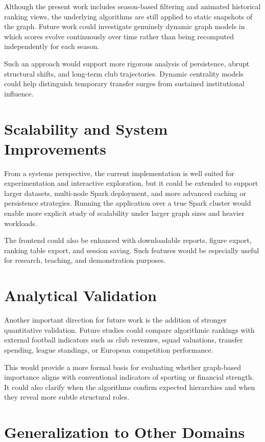 Although the present work includes season-based filtering and animated historical ranking views, the underlying algorithms are still applied to static snapshots of the graph. Future work could investigate genuinely dynamic graph models in which scores evolve continuously over time rather than being recomputed independently for each season.

Such an approach would support more rigorous analysis of persistence, abrupt structural shifts, and long-term club trajectories. Dynamic centrality models could help distinguish temporary transfer surges from sustained institutional influence.

\section{Scalability and System Improvements}
\label{sec:future_system}

From a systems perspective, the current implementation is well suited for experimentation and interactive exploration, but it could be extended to support larger datasets, multi-node Spark deployment, and more advanced caching or persistence strategies. Running the application over a true Spark cluster would enable more explicit study of scalability under larger graph sizes and heavier workloads.

The frontend could also be enhanced with downloadable reports, figure export, ranking table export, and session saving. Such features would be especially useful for research, teaching, and demonstration purposes.

\section{Analytical Validation}
\label{sec:future_validation}

Another important direction for future work is the addition of stronger quantitative validation. Future studies could compare algorithmic rankings with external football indicators such as club revenues, squad valuations, transfer spending, league standings, or European competition performance.

This would provide a more formal basis for evaluating whether graph-based importance aligns with conventional indicators of sporting or financial strength. It could also clarify when the algorithms confirm expected hierarchies and when they reveal more subtle structural roles.

\section{Generalization to Other Domains}
\label{sec:future_domains}

